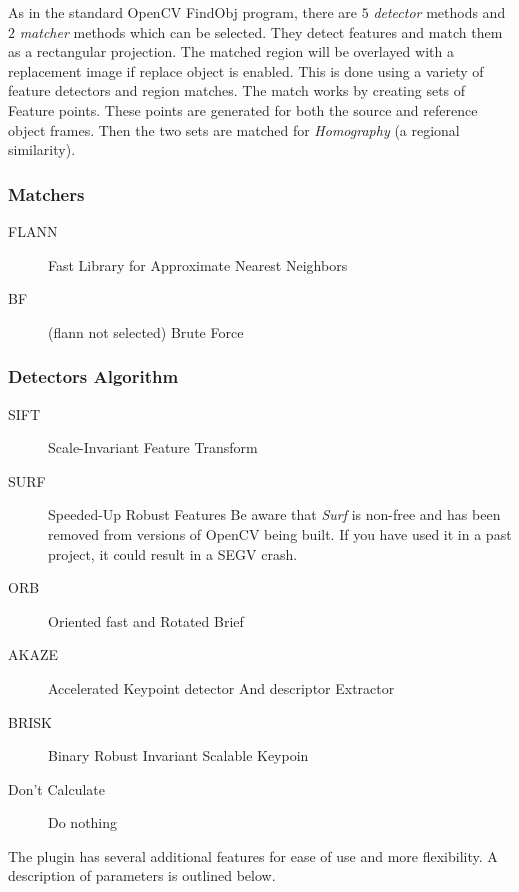 As in the standard OpenCV FindObj program, there are $5$ \textit{detector} methods and $2$ \textit{matcher} methods which can be selected. They detect features and match them as a rectangular projection. The matched region will be overlayed with a replacement image if replace object is enabled. This is done using a variety of feature detectors and region matches. The match works by creating sets of Feature points. These points are generated for both the source and reference object frames. Then the two sets are matched for \textit{Homography} (a regional similarity).

\subsubsection*{Matchers}%
\label{ssub:matchers}

\begin{description}
    \item[FLANN] Fast Library for Approximate Nearest Neighbors
    \item[BF] (flann not selected) Brute Force
\end{description}

\subsubsection*{Detectors Algorithm}%
\label{ssub:detectors_algorithm}

\begin{description}
    \item[SIFT] Scale-Invariant Feature Transform
    \item[SURF] Speeded-Up Robust Features
 Be aware that \textit{Surf} is non-free and has been removed from versions of OpenCV being built.
 If you have used it in a past project, it could result in a SEGV crash.
    \item[ORB] Oriented fast and Rotated Brief
    \item[AKAZE] Accelerated Keypoint detector And descriptor Extractor
    \item[BRISK] Binary Robust Invariant Scalable Keypoin
    \item [Don’t Calculate] Do nothing
\end{description}

The \CGG{} plugin has several additional features for ease of use and more flexibility. A description of parameters is outlined below.


